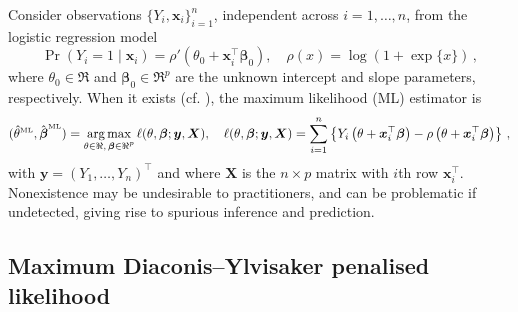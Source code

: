 \documentclass{article}
\theoremstyle{definition}
\newcommand*{\bb}{\boldsymbol}
\def\bX{\bb{X}}
\def\bx{\bb{x}}
\def\by{\bb{y}}
\def\bY{\bb{y}}
\def\bbeta{\bb{\beta}}
\begin{document}
\begin{bibunit}
Consider observations $\{Y_i, \bx_i\}_{i = 1}^n$, independent across $i = 1,\ldots,n$, from the
logistic regression model
\begin{equation}
\label{eq:logistic-model-intro}
    \Pr(Y_i=1\mid\bx_i)
    =
    \rho'\left(\theta_0+\bx_i^\top\bbeta_0\right), 
    \quad
    \rho(x)=\log(1+\exp\{x\})\,,
\end{equation}
where $\theta_0\in\Re$ and $\bbeta_0\in\Re^p$ are the unknown intercept and
slope parameters, respectively. When it exists
(cf. \citealt{albert+anderson:1984}), the maximum likelihood (ML) estimator is
\begin{equation}
\label{eq:log-reg-ml}
    (
        \hat\theta^{\textrm{\tiny ML}},
        \hat{\bbeta}^{\textrm{\tiny ML}}
    )
    =
    \underset{\substack{\theta\in\Re, \, \bbeta\in\Re^p}}{\arg\max} \, \ell(\theta, \bbeta; \bY, \bX), \quad  \ell(\theta, \bbeta; \bY, \bX) =
    \sum_{i=1}^n
    \left\{
        Y_i\left(\theta+\bx_i^\top\bbeta\right)
        -
        \rho\left(\theta+\bx_i^\top\bbeta\right)
    \right\}\,,
\end{equation}
with $\by  = (Y_1, \ldots, Y_n)^\top$ and where $\bX$ is the $n \times p$ matrix with $i$th row $\bx_i^\top$. 
Nonexistence may be undesirable to practitioners, and can be 
problematic if undetected, giving rise to spurious inference and prediction. 


\subsection{Maximum Diaconis--Ylvisaker penalised likelihood}


\end{bibunit}
\end{document}
